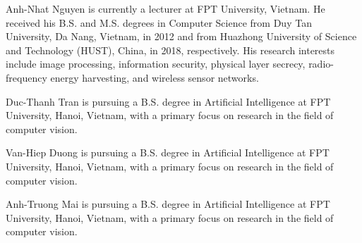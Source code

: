 \documentclass{ieeeaccess}
\begin{document}
\begin{IEEEbiography}{Anh-Nhat Nguyen}  is currently a lecturer at FPT University, Vietnam. He received his B.S. and M.S. degrees in Computer Science from Duy Tan University, Da Nang, Vietnam, in 2012 and from Huazhong University of Science and Technology (HUST), China, in 2018, respectively. His research interests include image processing, information security, physical layer secrecy, radio-frequency energy harvesting, and wireless sensor networks.
\end{IEEEbiography}

\begin{IEEEbiography}{Duc-Thanh Tran} is pursuing a B.S. degree in Artificial Intelligence at FPT University, Hanoi, Vietnam, with a primary focus on research in the field of computer vision.
\end{IEEEbiography}

\begin{IEEEbiography}{Van-Hiep Duong} is pursuing a B.S. degree in Artificial Intelligence at FPT University, Hanoi, Vietnam, with a primary focus on research in the field of computer vision.
\end{IEEEbiography}

\begin{IEEEbiography}{Anh-Truong Mai} is pursuing a B.S. degree in Artificial Intelligence at FPT University, Hanoi, Vietnam, with a primary focus on research in the field of computer vision.
\end{IEEEbiography}
\end{document}
